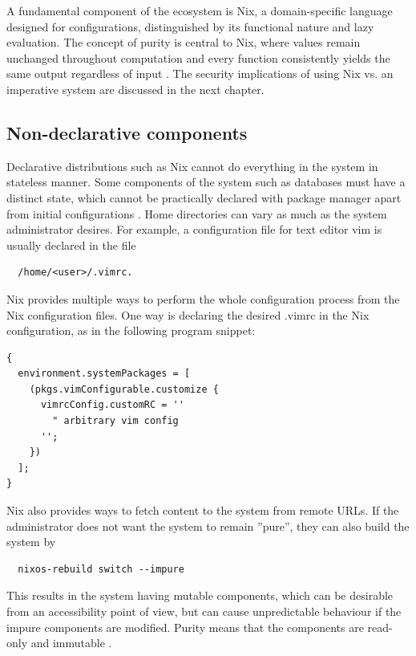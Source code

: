 A fundamental component of the ecosystem is Nix, a domain-specific
language designed for configurations, distinguished by its functional
nature and lazy evaluation. The concept of purity is central to Nix,
where values remain unchanged throughout computation and every
function consistently yields the same output regardless of input
\cite{dolstra2013charon}. The security implications of using Nix
vs. an imperative system are discussed in the next chapter.

\subsection{Non-declarative components} \label{nondeclarative}

Declarative distributions such as Nix cannot do everything in the
system in stateless manner. Some components of the system such as
databases must have a distinct state, which cannot be practically
declared with package manager apart from initial configurations
\cite{van2013reference}. Home directories can vary as much as the
system administrator desires. For example, a configuration file for
text editor vim is usually declared in the file
\begin{lstlisting}
  /home/<user>/.vimrc.
\end{lstlisting}
Nix provides multiple ways to perform the whole
configuration process from the Nix configuration files. One way is
declaring the desired .vimrc in the Nix configuration, as in the
following program snippet:

\begin{lstlisting}
{
  environment.systemPackages = [
    (pkgs.vimConfigurable.customize {
      vimrcConfig.customRC = ''
        " arbitrary vim config
      '';
    })
  ];
}
\end{lstlisting}
Nix also provides ways to fetch content to the system from
remote URLs. If the administrator does not want the system to
remain ''pure'', they can also build the system by
\begin{lstlisting}
  nixos-rebuild switch --impure
\end{lstlisting}
This results in the system having mutable components, which can be
desirable from an accessibility point of view, but can cause
unpredictable behaviour if the impure components are modified. Purity means that the components are read-only and
immutable \cite{dolstra2010nixos}.

